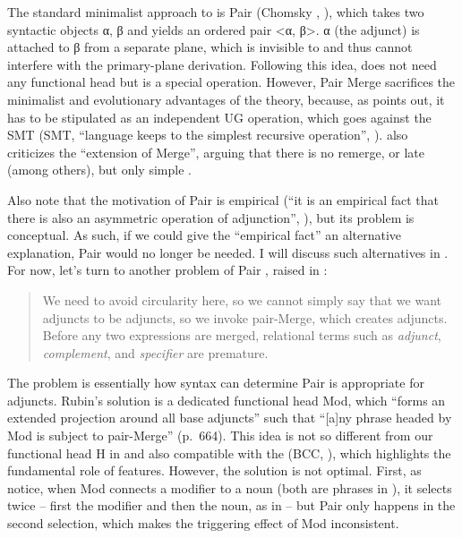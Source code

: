 \documentclass[output=paper]{langsci/langscibook}
\begin{document}
The standard minimalist approach to  is Pair  (Chomsky
\citeyear{Chomsky2000}, \citeyear{Chomsky2004}), which takes two syntactic
objects α,  β{} and yields an ordered pair <α, β>. α{} (the adjunct) is
attached to β{} from a separate plane, which is invisible to and thus cannot
interfere with the primary-plane derivation. Following this idea, 
does not need any functional head but is a special operation. However, Pair
Merge sacrifices the minimalist and evolutionary advantages of the theory,
because, as \citet[52]{Collins2017} points out, it has to be stipulated as an
independent \gls{UG} operation, which goes against the \glsdesc{SMT}
(\gls{SMT}, ``language keeps to the simplest recursive operation'',
\citealt[71]{BerwickChomsky2016}).  \citet[40]{Chomsky2013} also criticizes the
``extension of Merge'', arguing that there is no remerge,  or
late  (among others), but only simple .

Also note that the motivation of Pair  is empirical (``it is an empirical
fact that there is also an asymmetric operation of adjunction'',
\citealt[117]{Chomsky2004}), but its problem is conceptual. As such, if we
could give the ``empirical fact'' an alternative explanation, Pair  would
no longer be needed. I will discuss such alternatives in . For
now, let's turn to another problem of Pair , raised in \citet{Rubin2003}:

\blockquote[{\citealt[663]{Rubin2003}}]{We need to avoid circularity here, so
    we cannot simply say that we want adjuncts to be adjuncts, so we invoke
    pair-Merge, which creates adjuncts.  Before any two expressions are merged,
    relational terms such as \emph{adjunct}, \emph{complement}, and
\emph{specifier} are premature.}

\noindent The problem is essentially how syntax can determine Pair  is
appropriate for adjuncts. Rubin's solution is a dedicated functional head Mod,
which ``forms an extended projection around all base adjuncts'' such that
``[a]ny phrase headed by Mod is subject to pair-Merge'' (p.~664). This idea is
not so different from our functional head H in  and also compatible
with the  (\gls{BCC},
\citealt{Baker2008}), which highlights the fundamental role of features.
However, the solution is not optimal. First, as \citet[2]{ArsenijevicSio2009}
notice, when Mod connects a modifier to a noun (both are phrases in
\citealt{Rubin2003}), it selects twice -- first the modifier and then the
noun, as in  -- but Pair  only happens in the second
selection, which makes the triggering effect of Mod inconsistent.
\end{document}
